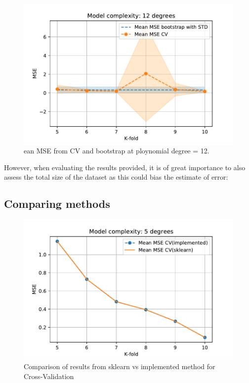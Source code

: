 \documentclass[11pt, a4paper]{article}
\begin{document}
\begin{figure}[h]
  \centering
  \includegraphics[scale=0.75]{figures/EX3_mse_cv_boot12.pdf}
  \caption{\label{fig:?}ean MSE from CV and bootstrap at ploynomial degree = 12.}
\end{figure}


However, when evaluating the results provided, it is of great importance to also assess the total size of the dataset as this could bias the estimate of error: 

\subsection*{Comparing methods}



\begin{figure}[h]
  \centering
  \includegraphics[scale=0.75]{figures/EX3_sk_vs_implemented_CV.pdf}
  \caption{\label{fig:?}Comparison of results from sklearn vs implemented method for Cross-Validation}
\end{figure}
\end{document}
